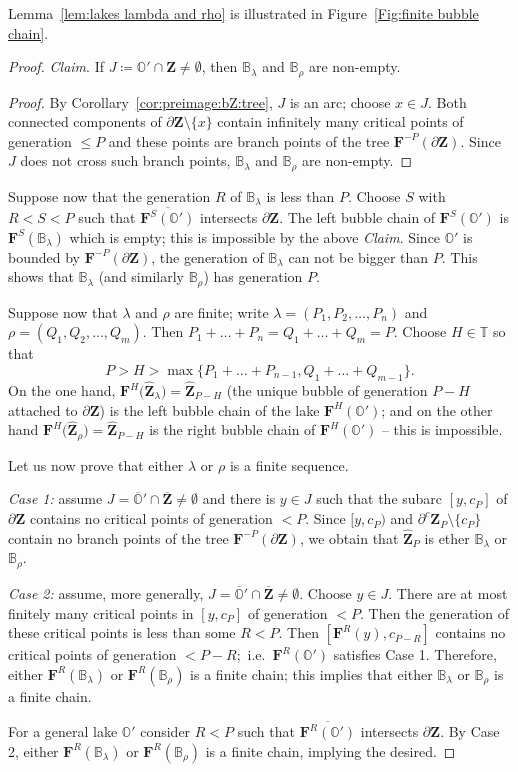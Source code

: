 \documentclass{amsart}
\newcommand{\1}{{\mathbb 1 }}
\newcommand\PT{\mathbb{ T}}
\newcommand{\bB}{{\mathbb{B}}}
\newcommand{\bO}{{\mathbb{O}}}
\newcommand{\bF}{{\mathbf F}}
\newcommand{\bZ}{{\mathbf Z}}
\theoremstyle{remark}
\numberwithin{equation}{section}
\theoremstyle{definition}
\theoremstyle{nonumberbreak}
\begin{document}
\noindent Lemma~\ref{lem:lakes lambda and rho} is illustrated in Figure~\ref{Fig:finite bubble chain}.
\begin{proof}
\emph{Claim}. If $J\coloneqq \bO'\cap \bZ\not=\emptyset$, then $\bB_\lambda$ and $\bB_\rho$ are non-empty. 
\begin{proof}
By Corollary~\ref{cor:preimage:bZ:tree}, $J$ is an arc; choose $x\in J$. Both connected components of $\partial \bZ\setminus\{x\}$ contain infinitely many critical points of generation $\le P$ and these points are branch points of the tree $\bF^{-P}(\partial \bZ)$. Since $J$ does not cross such branch points, $\bB_\lambda$ and $\bB_\rho$ are non-empty.
\end{proof}


Suppose now that the generation $R$ of $\bB_\lambda$ is less than $P$. Choose $S$ with $R< S<P$ such that $\overline{\bF^S(\bO')}$ intersects $\partial \bZ$. The left bubble chain of $\bF^S(\bO')$ is $\bF^S(\bB_{\lambda})$ which is empty; this is impossible by the above \emph{Claim}. Since $\bO'$ is bounded by $\bF^{-P}(\partial \bZ)$, the generation of $\bB_\lambda$ can not be bigger than $P$. This shows that $\bB_\lambda$ (and similarly $\bB_\rho$) has generation $P$. 

 
 
Suppose now that $\lambda$ and $\rho$ are finite; write $\lambda=(P_1,P_2,\dots, P_n)$ and $\rho=(Q_1,Q_2,\dots, Q_m)$. Then $P_1+\dots +P_n=Q_1+\dots + Q_m =P$. Choose $H\in \PT$ so that \[P>H>\max\{P_1+\dots + P_{n-1},Q_1+\dots + Q_{m-1}\}.\]
On the one hand,  $\bF^H\big(\widehat \bZ_\lambda\big)=\widehat \bZ_{P-H}$ (the unique bubble of generation $P-H$ attached to $\partial \bZ$) is the left bubble chain of the lake $\bF^H(\bO')$; and on the other hand $\bF^H\big(\widehat\bZ_\rho\big)=\widehat \bZ_{P-H}$ is the right bubble chain of $\bF^H(\bO')$ -- this is impossible.

Let us now prove that either $\lambda$ or $\rho$ is a finite sequence. 

\emph{Case 1:} assume $J=\overline \bO'\cap \overline\bZ\not=\emptyset$ and there is $y\in J$ such that the subarc $[y,c_P]$ of $\partial\bZ$ contains no critical points of generation $<P$. Since $[y,c_P)$ and $\partial^c\bZ_P\setminus \{c_P\} $ contain no branch points of the tree $\bF^{-P}(\partial \bZ)$, we obtain that $\widehat \bZ_P$ is ether $\bB_\lambda$ or $\bB_{\rho}$.

\emph{Case 2:} assume, more generally, $J=\overline \bO'\cap \overline\bZ\not=\emptyset$. Choose $y\in J$. There are at most finitely many critical points in $[y,c_P]$ of generation $<P$. Then the generation of these critical points is less than some $R<P$. Then $[\bF^R(y),c_{P-R}]$ contains no critical points of generation $<P-R$;~i.e.~$\bF^R(\bO')$ satisfies Case 1. Therefore, either $\bF^R(\bB_\lambda)$ or $\bF^R(\bB_\rho)$ is a finite chain; this implies that either $\bB_\lambda$ or $\bB_\rho$ is a finite chain.

For a general lake $\bO'$ consider $R<P$ such that $\overline{\bF^R(\bO')}$ intersects $\partial \bZ$. By Case 2, either $\bF^R(\bB_\lambda)$ or $\bF^R(\bB_\rho)$ is a finite chain, implying the desired.
\end{proof}
\end{document}
